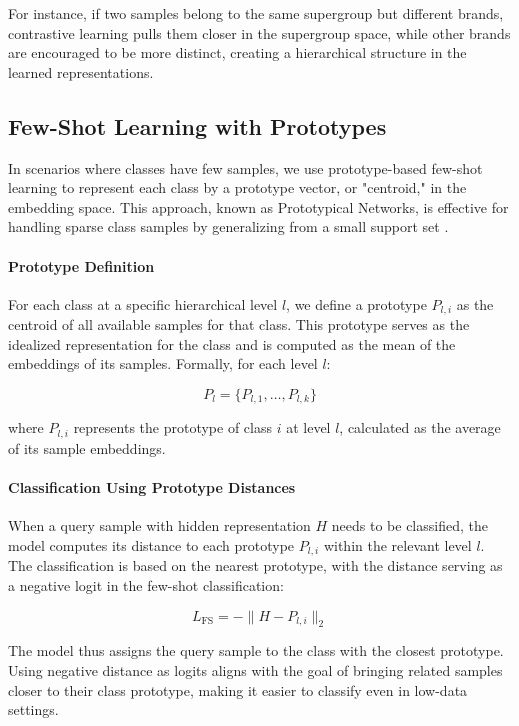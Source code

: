 \documentclass[9pt,a4paper,twoside]{rho-class/rho}
\begin{document}
For instance, if two samples belong to the same supergroup but different brands, contrastive learning pulls them closer in the supergroup space, while other brands are encouraged to be more distinct, creating a hierarchical structure in the learned representations.

\subsection{Few-Shot Learning with Prototypes}

In scenarios where classes have few samples, we use prototype-based few-shot learning to represent each class by a prototype vector, or "centroid," in the embedding space. This approach, known as Prototypical Networks, is effective for handling sparse class samples by generalizing from a small support set \cite{snell2017prototypical}.

\paragraph{Prototype Definition}
For each class at a specific hierarchical level \( l \), we define a prototype \( P_{l,i} \) as the centroid of all available samples for that class. This prototype serves as the idealized representation for the class and is computed as the mean of the embeddings of its samples. Formally, for each level \( l \):

\[
P_l = \{ P_{l,1}, \ldots, P_{l,k} \}
\]

where \( P_{l,i} \) represents the prototype of class \( i \) at level \( l \), calculated as the average of its sample embeddings.

\paragraph{Classification Using Prototype Distances}
When a query sample with hidden representation \( H \) needs to be classified, the model computes its distance to each prototype \( P_{l,i} \) within the relevant level \( l \). The classification is based on the nearest prototype, with the distance serving as a negative logit in the few-shot classification:

\[
L_{\text{FS}} = -\| H - P_{l,i} \|_2
\]

The model thus assigns the query sample to the class with the closest prototype. Using negative distance as logits aligns with the goal of bringing related samples closer to their class prototype, making it easier to classify even in low-data settings.
\end{document}
